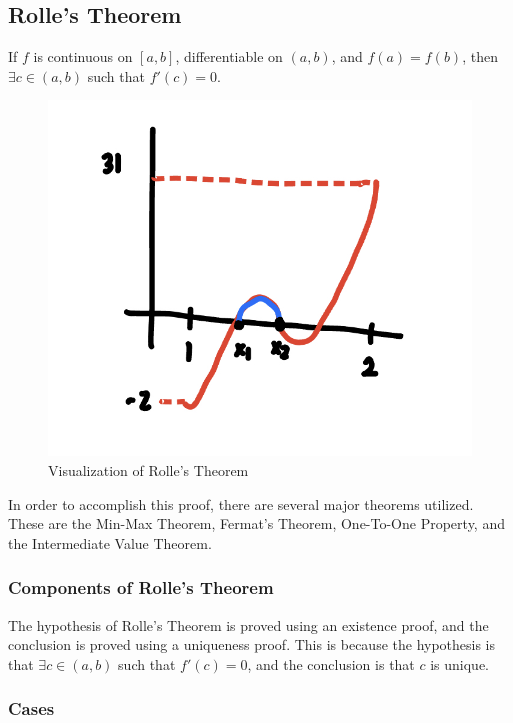 \documentclass{article}
\begin{document}
\subsection*{Rolle's Theorem}

If $f$ is continuous on $[a,b]$, differentiable on $(a,b)$, and $f(a) = f(b)$, then $\exists c \in (a,b)$ such that $f'(c) = 0$.

\begin{figure}[!htb]
    \centering
    \includegraphics[scale=0.20]{rolles-theorem.jpeg}
    \caption{Visualization of Rolle's Theorem}
    \label{fig:rolles-theorem}
\end{figure}

In order to accomplish this proof, there are several major theorems utilized. These are the Min-Max Theorem, Fermat's Theorem, One-To-One Property, and the Intermediate Value Theorem.

\subsubsection*{Components of Rolle's Theorem}

The hypothesis of Rolle's Theorem is proved using an existence proof, and the conclusion is proved using a uniqueness proof. This is because the hypothesis is that $\exists c \in (a,b)$ such that $f'(c) = 0$, and the conclusion is that $c$ is unique.

\subsubsection*{Cases}
\end{document}
